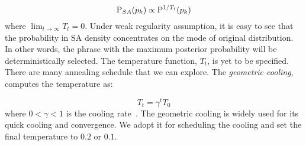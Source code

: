 \begin{equation}
  \P_{SA}(p_k) \propto \P^{1/T_t}(p_k)
\end{equation}
%
where $\lim_{t\rightarrow \infty} T_t = 0$. Under weak regularity assumption, it
is easy to see that the probability in SA density concentrates on the mode of
original distribution. In other words, the phrase with the maximum posterior
probability will be deterministically selected.
The temperature function, $T_t$, is yet to be specified. There are many
annealing schedule that we can explore. The \emph{geometric cooling}, computes
the temperature as:

\begin{equation} T_t = \gamma^t T_0 \end{equation}
%
where $0 < \gamma < 1$ is the cooling rate~\cite{yuan2004annealed}. The
geometric cooling is widely used for its quick cooling and convergence. We adopt
it for scheduling the cooling and set the final temperature to $0.2$ or $0.1$.
